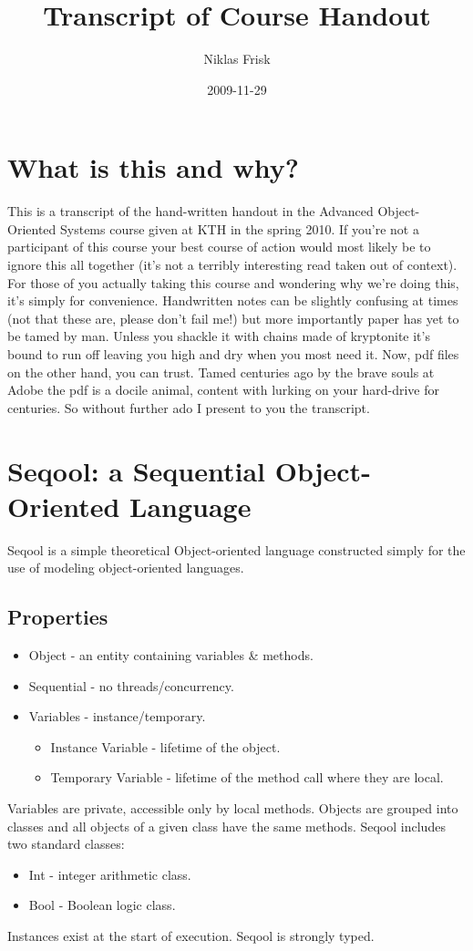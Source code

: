 \documentclass[]{article}
\title{Transcript of Course Handout}
\author{Niklas Frisk}
\date{2009-11-29}
\begin{document}
\ifpdf
{}
\else
{}
\fi

\maketitle

\section{What is this and why?}
This is a transcript of the hand-written handout in the Advanced Object-Oriented Systems course given at KTH in the spring 2010. If you're not a participant of this course your best course of action would most likely be to ignore this all together (it's not a terribly interesting read taken out of context). For those of you actually taking this course and wondering why we're doing this, it's simply for convenience. Handwritten notes can be slightly confusing at times (not that these are, please don't fail me!) but more importantly paper has yet to be tamed by man. Unless you shackle it with chains made of kryptonite it's bound to run off leaving you high and dry when you most need it. Now, pdf files on the other hand, you can trust. Tamed centuries ago by the brave souls at Adobe the pdf is a docile animal, content with lurking on your hard-drive for centuries. So without further ado I present to you the transcript.

\section{Seqool: a Sequential Object-Oriented Language}
Seqool is a simple theoretical Object-oriented language constructed simply for the use of modeling object-oriented languages.
\subsection{Properties}
\begin{itemize}
	\item Object - an entity containing variables \& methods.
	\item Sequential - no threads/concurrency.
	\item Variables - instance/temporary.
	\begin{itemize}
		\item Instance Variable - lifetime of the object.
		\item Temporary Variable - lifetime of the method call where they are local.
	\end{itemize}
\end{itemize}
Variables are private, accessible only by local methods. Objects are grouped into classes and all objects of a given class have the same methods. Seqool includes two standard classes:
\begin{itemize}
	\item Int - integer arithmetic class.
	\item Bool - Boolean logic class.
\end{itemize}
Instances exist at the start of execution. Seqool is strongly typed.
\end{document}
